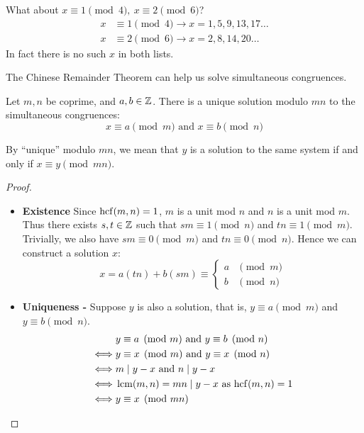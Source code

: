 \documentclass[../main.tex]{subfiles}
\begin{document}
What about $x \equiv 1 \pmod{4},\ x \equiv 2 \pmod{6}$?
\begin{align*}
  x &\equiv 1 \pmod{4} \to x = 1, 5, 9, 13, 17\ldots \\
  x &\equiv 2 \pmod{6} \to x = 2, 8, 14, 20 \ldots
\end{align*}
In fact there is no such $x$ in both lists.

The Chinese Remainder Theorem can help us solve simultaneous congruences.
\begin{theorem}
  Let $m, n$ be coprime, and $a, b \in \mathbb{Z}$.
  There is a unique solution modulo $mn$ to the simultaneous congruences:
  \[
    x \equiv a \pmod{m} \text{ and }
    x \equiv b \pmod{n}
  \]
\end{theorem}
\begin{remark}[Note]
  By ``unique'' modulo $mn$, we mean that $y$ is a solution to the same system if and only if $x \equiv y \pmod{mn}$.
\end{remark}
\begin{proof}
  \begin{itemize}
    \item \textbf{Existence}
      Since $\operatorname{hcf}(m, n) = 1$, $m$ is a unit mod $n$ and $n$ is a unit mod $m$.
      Thus there exists $s, t \in \mathbb{Z}$ such that $sm \equiv 1 \pmod{n}$ and $tn \equiv 1 \pmod{m}$.
      Trivially, we also have $sm \equiv 0 \pmod{m}$ and $tn \equiv 0 \pmod{n}$.
      Hence we can construct a solution $x$:
      \[
        x = a(tn) + b(sm) \equiv \begin{cases}
          a & \pmod{m} \\
          b & \pmod{n}
        \end{cases}
      \]
      \item \textbf{Uniqueness -}
      Suppose $y$ is also a solution, that is, $y \equiv a \pmod{m}$ and $y \equiv b \pmod{n}$.
      \begin{align*}
        &y \equiv a \pmod{m} \text{ and } y \equiv b \pmod{n} \\
        \iff& y \equiv x \pmod{m} \text{ and } y\equiv x \pmod{n} \\
        \iff& m \mid y - x \text{ and } n \mid y - x \\
        \iff& \operatorname{lcm}(m, n) = mn \mid y - x \text{ as $\operatorname{hcf}(m, n) = 1$} \\
        \iff& y \equiv x \pmod{mn}
      \end{align*}
  \end{itemize}
\end{proof}
\end{document}
